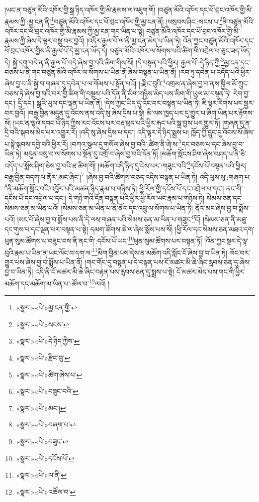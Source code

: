 །ཡང་ན་བཙུན་མོའི་འཁོར་གྱི་སྒྲ་ཉིད་འཁོར་གྱི་མི་རྣམས་ལ་འཇུག་གོ། །བཙུན་མོའི་འཁོར་དང་ཕོ་བྲང་འཁོར་གྱི་མི་རྣམས་ཀྱི་:མྱ་ངན་ནི་\footnote{«སྣར་»«པེ་»མྱ་ངན་གྱི་}བཙུན་མོའི་འཁོར་དང་ཕོ་བྲང་འཁོར་གྱི་མྱ་ངན་ནོ། །བསྲབས་ཤིང་:སངས་པ་\footnote{«སྣར་»«པེ་»སངས་}ནི་བཙུན་མོའི་འཁོར་དང་ཕོ་བྲང་འཁོར་གྱི་མི་རྣམས་ཀྱི་མྱ་ངན་གང་ཡིན་པ་སྟེ། བཙུན་མོའི་འཁོར་དང་ཕོ་བྲང་འཁོར་གྱི་མི་རྣམས་ཀྱི་ཞེས་དེ་ལྟར་བསྡུ་བར་བྱའོ། །འདིར་རྒྱལ་པོ་ལ་ནི་མྱ་ངན་མེད་པ་ཡིན་ཏེ། འོན་ཀྱང་བཙུན་མོའི་འཁོར་དང་ཕོ་བྲང་འཁོར་གྱིས་ནི་རྒྱལ་པོ་དེ་མྱ་ངན་ཡོད་དེ། བཙུན་མོའི་འཁོར་ལ་སོགས་པའི་ཚིག་གི་འབྲེལ་པ་ཅུང་ཟད་ཡོད་དེ། སྐྱེ་དགུ་བདེ་ན་ནི་རྒྱལ་པོ་བདེ་ཞེས་བྱ་བའི་ཚིག་གིས་སོ། །དེ་བསྟན་པའི་ཕྱིར། རྒྱལ་པོ་:དེ་ཉིད་ཀྱི་\footnote{«སྣར་»«པེ་»དེ་ཉིད་ཀྱིས་}མྱ་ངན་དང་བཅས་པ་ནི་གང་བཙུན་མོའི་འཁོར་ལ་སོགས་པ་ཡིན་ནོ་ཞེས་བསྟན་པ་ཡིན་ནོ། །རབ་ཏུ་དབེན་པ་འདོད་པའི་ཕྱིར་ཞེས་བྱ་བ་ནི་སྐྱེ་བ་གཞན་དུ་དབེན་པ་ལ་གོམས་པ་སྟོན་པའོ། །:རྫིང་བུའི་\footnote{«སྣར་»«པེ་»རྫིང་བུ་}འགྲམ་ན་ཞེས་བྱ་བ་ནས་སྐྱིལ་མོ་ཀྲུང་བཅས་ཏེ་ཞེས་བྱ་བའི་བར་གྱི་ཚིག་གི་བསྡུས་པའི་དོན་ནི་མིག་གཉིས་མེད་པས་མིག་གི་ཡུལ་མ་བསྟན་ཏེ། རེག་བྱ་དང་། དྲི་དང་། སྒྲའི་ཡུལ་དང་ལྡན་པ་ཡིན་ནོ། །དེས་ཀྱང་ཡིད་དུ་འོང་བར་བསྟན་པ་ཡིན་ཏེ། ཇི་ལྟར་རིགས་པར་སྦྱར་བར་བྱའོ། །བརྒྱ་བྱིན་མདུན་དུ་འོངས་ནས་འདི་སུ་ཞེས་དྲིས་པ་སྟེ། མི་ལས་ཁྱད་པར་དུ་གྱུར་པ་ཞིག་ཡིན་པར་རྟོགས་སོ། །ཡང་ན་ལྷའི་དབང་པོ་ཉིད་ཀྱིས་རང་འོངས་པར་བརྡ་ཕྲད་པའི་ཕྱིར་རྐང་པའི་སྒྲ་བྱས་པར་གྱུར་ཏོ། །གཞན་དུ་ན་དྲི་བའི་སྐབས་མེད་པར་འགྱུར་རོ། །འདི་སུ་ཞེས་དྲིས་པ་དང་། འདི་ལྟར་དེ་ཉིད་སྨྲས་པ། ཁྱོད་ཀྱི་དྲུང་དུ་འོངས་སོ་ཞེས་པ་སྟེ་སྐབས་དབྱེ་བའི་ཕྱིར་རོ། །བཀའ་སྩལ་དུ་གསོལ་ཞེས་བྱ་བའི་:ཚིག་ནི་ཞེ་ས་\footnote{«སྣར་»«པེ་»ཚིག་ཞེས་པ་}དང་བཅས་པ་དང་ཞེས་བྱ་བ་ཡིན་ཏེ། མདུན་བསུ་བ་ལ་སོགས་པ་སྔོན་དུ་འགྲོ་བ་ཞེས་བྱ་བའི་དོན་ཏོ། །མཆོག་སློངས་ཤིག་ཞེས་བཤད་པ་ནི་ཅི་འདོད་པ་སྨོས་ཤིག་ཅེས་བྱ་བའི་ཐ་ཚིག་གོ། །མཆོག་འདི་ཉིད་དུ་ངེས་པར་:གཟུང་བའི་\footnote{«སྣར་»«པེ་»བཟུང་བའི་}དངོས་པོ་བསྟན་པའི་ཕྱིར། བརྒྱ་བྱིན་བདག་ལ་ནོར་:མང་ཞིང་།\footnote{«སྣར་»«པེ་»མང་།} །ཞེས་བྱ་བའི་ཚིགས་བཅད་འདིས་བསྟན་པ་ཡིན་ཏེ། འདི་ལུས་སུ་:གཞག་པ་\footnote{«སྣར་»«པེ་»བཞག་པ་}ནི་མཆོག་སློང་བའི་འབྱོར་པའི་མཚན་ཉིད་རྣམ་པ་གཉིས་ཏེ། ཕྱི་རོལ་གྱི་དངོས་པོ་དང་འབྲེལ་པ་དང་། ནང་གི་དངོས་པོ་དང་འབྲེལ་པ་དང་། དེ་གཉི་གའི་དོན་བསྟན་པའི་ཕྱིར་ཕྱི་རོལ་ཡང་རྣམ་པ་གཉིས་ཏེ། སེམས་ཅན་དང་སེམས་ཅན་མ་ཡིན་པའོ། །སེམས་ཅན་མ་ཡིན་པ་ནི་ནོར་དང་འབྲུ་ལ་སོགས་པ་ཡིན་ཏེ། ནོར་མང་ཞེས་བྱ་བ་སྨོས་པའོ། །མང་པོ་ཞེས་བྱ་བ་སྨོས་པས་ནི་དེ་ལས་གཞན་པའི་སེམས་ཅན་མ་ཡིན་པ་གཟུང་\footnote{«སྣར་»«པེ་»བཟུང་}ངོ། །སེམས་ཅན་ནི་མཐུ་དང་གུས་པ་དང་ལྡན་པར་བསྟན་པ་སྟེ། དམག་ཚོགས་ཆེ་ལ་ཞེས་སྨོས་པས་སོ། །ཕྱི་རོལ་དང་སེམས་ཅན་མཐའ་དག་ཕུན་སུམ་ཚོགས་པ་བཟུང་བས་ནི་ནང་གི་:དངོས་པོ་ཡང་\footnote{«སྣར་»«པེ་»དངོས་པོ་}ཕུན་སུམ་ཚོགས་པར་བསྟན་ཏོ། །འོན་ཀྱང་སྔར་དེ་ལྟ་བུའི་རྣམ་པ་ཡིན་ན་ཡང་ལོང་བ་དག་ལ་\footnote{«སྣར་»«པེ་»ལ་ནི་}མིག་བྱིན་པས་དེས་ན་མཆོག་འདི་སློང་ངོ་ཞེས་བྱ་བ་ཡིན་ཏེ། ལོང་བར་གྱུར་པས་ཞེས་བྱ་བ་སྨོས་པ་ཡིན་ནོ། །གང་གོང་དུ་བསྟན་པ་དེ་བསྟན་པས་ངོ་མཚར་མི་ཆེ་ཞིང་རླབས་ཅན་དུ་ཞེས་བྱ་བ་ཡིན་ཏེ། འདི་ནི་ངོ་མཚར་མི་ཆེ་ཞིང་བརྟན་པས་རླབས་ཅན་དུ་སྨྲས་པ་སྟེ། ངོ་མཚར་མེད་པས་གང་གི་ཕྱིར་མཆོག་དང་མཆོག་མ་ཡིན་པ་:ཚོལ་བ་\footnote{«སྣར་»«པེ་»འཚོལ་བ་}ལའོ། །
